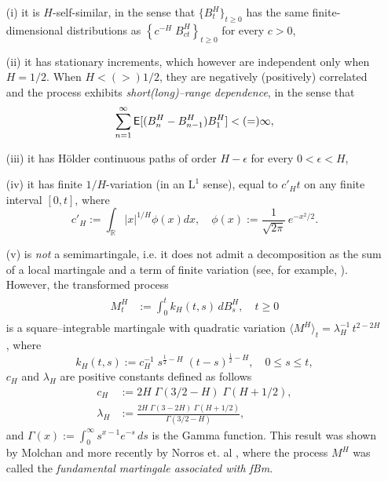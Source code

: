 \documentclass[11pt,reqno]{amsart}
\theoremstyle{remark}
\begin{document}
\begin{enumerate}
\item[(i)]  it is $H$-self-similar,  in the sense that $\{B_{t}^{H}\}_{t \geq 0}$ has the same finite-dimensional distributions as  $\left\{c^{-H}\; B^{H}_{ct} \right\}_{t \geq 0}$ for every $c>0$,
\item[(ii)] it has  stationary  increments, which however are independent only when $H=1/2$. When $H<(>)1/2$, they are  negatively (positively) correlated and the process exhibits \textit{short(long)--range dependence}, in the sense that 
$$\sum_{n=1}^{\infty} {{\sf E}}[(B^{H}_{n} - B^{H}_{n-1}) B^{H}_{1}]< (=) \infty,$$
\item[(iii)] it has H\"older continuous paths of order $H-\epsilon$ for every $0 < \epsilon <H$, 
\item[(iv)] it has finite $1/H$-variation (in an $\text{L}^{1}$ sense), equal to $c'_{H} t$ on any finite interval $[0,t]$, where 
$$c'_{H}:= \int_{\mathbb{R}} |x|^{1/H} \phi(x) dx, \quad \phi(x):= \frac{1}{\sqrt{2 \pi}} \, e^{-x^{2}/2}.$$
\item[(v)] is \textit{not} a semimartingale, i.e. it does not admit a decomposition as the sum of a local martingale and a term of finite variation  (see, for example, \cite{rogers}). However, the transformed process  
\begin{align}  \label{M}
 \begin{split}
M_{t}^{H}  &:= \int_{0}^{t} k_{H}(t,s) \, dB^{H}_{s} , \quad t \geq 0 
\end{split}
\end{align}
is a square--integrable martingale with  quadratic variation  $\langle M^{H} \rangle_{t}= \lambda^{-1}_{H} \,  t^{2-2H}$, where 
$$ k_{H}(t,s) := c_{H}^{-1} \;s^{\frac{1}{2}-H}\;(t-s)^{\frac{1}{2} - H}, \quad 0 \leq s \leq t, $$
$c_{H}$ and $\lambda_{H}$ are positive constants defined as follows
\begin{align*} 
c_{H} &:= 2H\;\Gamma\left( 3/2- H \right)\; \Gamma\left(H + 1/2 \right) ,   \\
\lambda_{H} &:= \frac{2H\;\Gamma(3-2H)\;\Gamma\left(H + 1/2 \right)}{\Gamma\left( 3/2 - H \right)},
\end{align*} 
and $\Gamma(x):= \int_{0}^{\infty} s^{x-1} e^{-s} \, ds$ is the  Gamma function. 
This result  was shown by Molchan \cite{molchan} and more recently by Norros et. al \cite{NVV}, 
where the process $M^{H}$ was called the \textit{fundamental martingale associated with fBm}. 
\end{enumerate}
\end{document}
